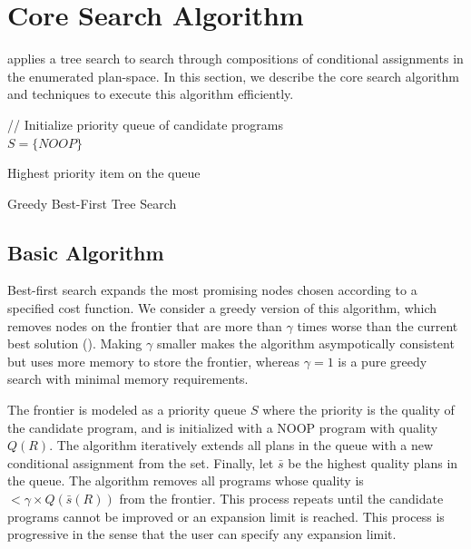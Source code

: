 \section{Core Search Algorithm}\label{s:search}
\sys applies a tree search to search through compositions of conditional assignments in the enumerated plan-space. In this section, we describe the core search algorithm and techniques to execute this algorithm efficiently.

{
\begin{algorithm}[t]

// Initialize priority queue of candidate programs\\
$S = \{NOOP\}$



\Return Highest priority item on the queue
\caption{Greedy Best-First Tree Search}
\label{alg:main}
\end{algorithm}
}

\subsection{Basic Algorithm}
Best-first search expands the most promising nodes chosen according to a specified cost function.
We consider a greedy version of this algorithm, which removes nodes on the frontier that are more than $\gamma$ times worse than the current best solution ().
Making $\gamma$ smaller makes the algorithm asympotically consistent but uses more memory to store the frontier, whereas $\gamma=1$ is a pure greedy search with minimal memory requirements.  

The frontier is modeled as a priority queue $S$ where the priority is the quality of the candidate program, and is initialized with a NOOP program with quality $Q(R)$.  
The algorithm iteratively extends all plans in the queue with a new conditional assignment from the set. 
Finally, let $\bar{s}$ be the highest quality plans in the queue.  The algorithm removes all programs whose quality is $<\gamma\times Q(\bar{s}(R))$ from the frontier.  
This process repeats until the candidate programs cannot be improved or an expansion limit is reached.
This process is progressive in the sense that the user can specify any expansion limit.

